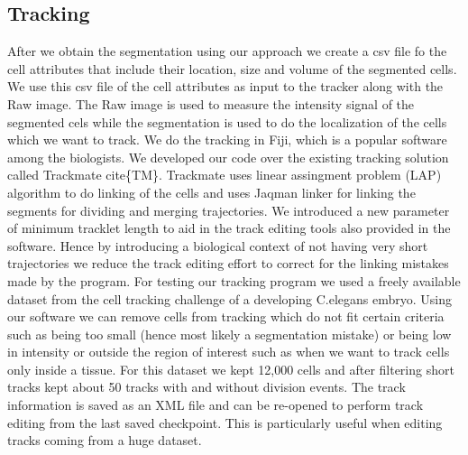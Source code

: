 \documentclass[letterpaper,compsoc,twoside]{IEEEtran}
\begin{document}
\subsection{Tracking%
  \label{tracking}%
}
After we obtain the segmentation using our approach we create a csv file fo the cell attributes that include their location, size and volume of the segmented cells. We use this csv file of the cell attributes as input to the tracker along with the Raw image. The Raw image is used to measure the intensity signal of the segmented cels while the segmentation is used to do the localization of the cells which we want to track. We do the tracking in Fiji, which is a popular software among the biologists. We developed our code over the existing tracking solution called Trackmate cite\{TM\}. Trackmate uses linear assingment  problem (LAP) algorithm to do linking of the cells and uses Jaqman linker for linking the segments for dividing and merging trajectories. We introduced a new parameter of minimum tracklet length to aid in the track editing tools also provided in the software. Hence by introducing a biological context of not having very short trajectories we reduce the track editing effort to correct for the linking mistakes made by the program. For testing our tracking program we used a freely available dataset from the cell tracking challenge of a developing C.elegans embryo. Using our software we can remove cells from tracking which do not fit certain criteria such as being too small (hence most likely a segmentation mistake) or being low in intensity or outside the region of interest such as when we want to track cells only inside a tissue. For this dataset we kept 12,000 cells and after filtering short tracks kept about 50 tracks with and without division events. The track information is saved as an XML file and can be re-opened to perform track editing from the last saved checkpoint. This is particularly useful when editing tracks coming from a huge dataset.
\end{document}
